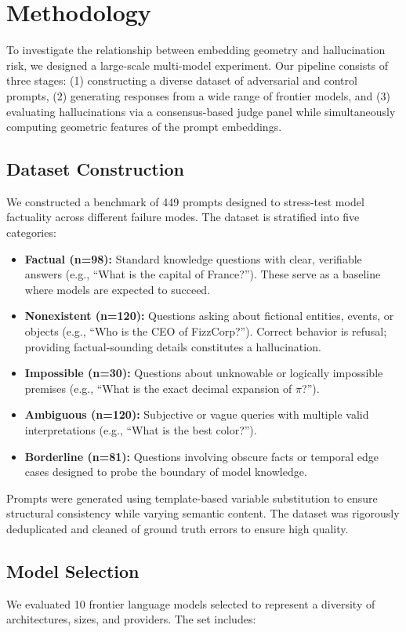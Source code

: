 \documentclass{article}
\begin{document}
\section{Methodology}
To investigate the relationship between embedding geometry and hallucination risk, we designed a large-scale multi-model experiment. Our pipeline consists of three stages: (1) constructing a diverse dataset of adversarial and control prompts, (2) generating responses from a wide range of frontier models, and (3) evaluating hallucinations via a consensus-based judge panel while simultaneously computing geometric features of the prompt embeddings.

\subsection{Dataset Construction}
We constructed a benchmark of 449 prompts designed to stress-test model factuality across different failure modes. The dataset is stratified into five categories:

\begin{itemize}
    \item \textbf{Factual (n=98):} Standard knowledge questions with clear, verifiable answers (e.g., ``What is the capital of France?''). These serve as a baseline where models are expected to succeed.
    \item \textbf{Nonexistent (n=120):} Questions asking about fictional entities, events, or objects (e.g., ``Who is the CEO of FizzCorp?''). Correct behavior is refusal; providing factual-sounding details constitutes a hallucination.
    \item \textbf{Impossible (n=30):} Questions about unknowable or logically impossible premises (e.g., ``What is the exact decimal expansion of $\pi$?'').
    \item \textbf{Ambiguous (n=120):} Subjective or vague queries with multiple valid interpretations (e.g., ``What is the best color?'').
    \item \textbf{Borderline (n=81):} Questions involving obscure facts or temporal edge cases designed to probe the boundary of model knowledge.
\end{itemize}

Prompts were generated using template-based variable substitution to ensure structural consistency while varying semantic content. The dataset was rigorously deduplicated and cleaned of ground truth errors to ensure high quality.

\subsection{Model Selection}
We evaluated 10 frontier language models selected to represent a diversity of architectures, sizes, and providers. The set includes:
\end{document}
